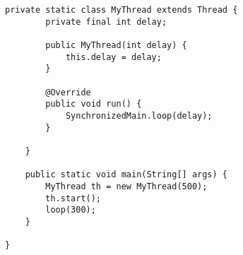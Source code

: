 \begin{lstlisting}[basicstyle=\small,]
    private static class MyThread extends Thread {
        private final int delay;

        public MyThread(int delay) {
            this.delay = delay;
        }

        @Override
        public void run() {
            SynchronizedMain.loop(delay);
        }

    }

    public static void main(String[] args) {
        MyThread th = new MyThread(500);
        th.start();
        loop(300);
    }

}
\end{lstlisting}




